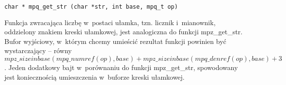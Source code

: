 \begin{lstlisting}
char * mpq_get_str (char *str, int base, mpq_t op)
\end{lstlisting}

Funkcja zwracająca liczbę w~postaci ułamka, tzn. licznik i~mianownik, oddzielony znakiem kreski ułamkowej, jest analogiczna do funkcji mpz\_get\_str. Bufor wyjściowy, w~którym chcemy umieścić rezultat funkcji powinien być wystarczający -- równy $mpz\_sizeinbase(mpq\_numref(op), \allowbreak base) + mpz\_sizeinbase (mpq\_denref(op), base) + 3$. Jeden dodatkowy bajt w~porównaniu do funkcji mpz\_get\_str, spowodowany jest koniecznością umieszczenia w~buforze kreski ułamkowej.